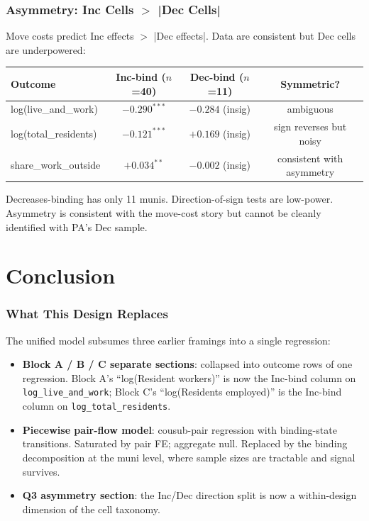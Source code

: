 \documentclass[xcolor = x11names, compress, aspectratio = 169]{beamer}
\begin{document}
    \begin{frame}
    \frametitle{Asymmetry: Inc Cells $>$ |Dec Cells|}
        \footnotesize
        Move costs predict Inc effects $>$ |Dec effects|.
        Data are consistent but Dec cells are underpowered:
        \medskip
        \scriptsize
        \renewcommand{\arraystretch}{1.20}
        \setlength{\tabcolsep}{8pt}
        \begin{tabular}{lccc}
            \toprule
            Outcome & Inc-bind ($n$=40) & Dec-bind ($n$=11) & Symmetric? \\
            \midrule
            log(live\_and\_work)  & $-0.290^{***}$ & $-0.284$ (insig) & ambiguous \\
            log(total\_residents) & $-0.121^{***}$ & $+0.169$ (insig) & sign reverses but noisy \\
            share\_work\_outside  & $+0.034^{**}$  & $-0.002$ (insig) & consistent with asymmetry \\
            \bottomrule
        \end{tabular}
        \medskip
        \footnotesize
        Decreases-binding has only 11 munis. Direction-of-sign tests are
        low-power. Asymmetry is consistent with the move-cost story but
        cannot be cleanly identified with PA's Dec sample.
    \end{frame}

\section{Conclusion}

    \begin{frame}
    \frametitle{What This Design Replaces}
        \footnotesize
        The unified model subsumes three earlier framings into a single regression:
        \medskip
        \begin{itemize}\setlength{\itemsep}{0.05cm}
            \item \textbf{Block A / B / C separate sections}: collapsed
            into outcome rows of one regression.
            Block A's ``log(Resident workers)'' is now the Inc-bind column on
            \texttt{log\_live\_and\_work}; Block C's
            ``log(Residents employed)'' is the Inc-bind column on
            \texttt{log\_total\_residents}.
            \item \textbf{Piecewise pair-flow model}: cousub-pair regression
            with binding-state transitions. Saturated by pair FE; aggregate null.
            Replaced by the binding decomposition at the muni level, where
            sample sizes are tractable and signal survives.
            \item \textbf{Q3 asymmetry section}: the Inc/Dec direction split
            is now a within-design dimension of the cell taxonomy.
        \end{itemize}
    \end{frame}
\end{document}
